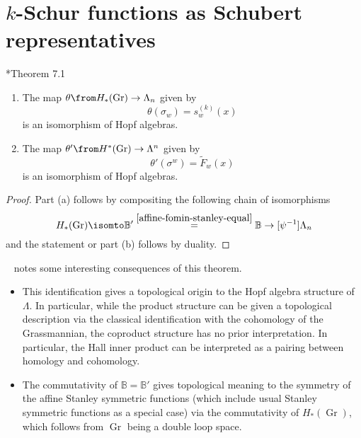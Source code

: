 \documentclass[11pt,leqno,oneside]{amsart}
\numberwithin{thm}{section}
\newcommand{\B}{\mathbb{B}}
\newcommand{\Gr}{\operatorname{Gr}}
\newcommand{\sym}{\Lambda}
\begin{document}
\section{\(k\)-Schur functions as Schubert representatives}\label{schubert-representatives}
\begin{thm}{\cite{lam}*{Theorem 7.1}}\label{k-schur-functions-are-schubert-reps}
  \begin{enumerate}
  \item The map \(\theta \from H_*(\Gr) \to \sym_n\) given by
    \[
      \theta(\sigma_w) = s_w^{(k)}(x)
    \]
    is an isomorphism of Hopf algebras.
  \item The map
    \(\theta' \from H^*(\Gr) \to \sym^n\) given by
    \[
      \theta'(\sigma^w) = \tilde{F}_w(x)
    \]
    is an isomorphism of Hopf algebras.
  \end{enumerate}
\end{thm}
\begin{proof}
  Part (a) follows by compositing the following chain of isomorphisms \[
    H_*(\Gr) \isomto \B' \overset{\ref{affine-fomin-stanley-equal}}{=}
    \B \to[\psi^{-1}] \sym_n 
  \]
  and the statement or part (b) follows by duality.
\end{proof}
~\cite{lam} notes some interesting consequences of this theorem.
\begin{itemize}
\item This identification gives a topological origin to the Hopf
  algebra structure of \(\sym\). In particular, while the product
  structure can be given a topological description via the classical
  identification with the cohomology of the Grassmannian, the
  coproduct structure has no prior interpretation. In particular, the
  Hall inner product can be interpreted as a pairing between homology
  and cohomology.
\item The commutativity of \(\B = \B'\) gives topological meaning to
  the symmetry of the affine Stanley symmetric functions (which
  include usual Stanley symmetric functions as a special case) via the
  commutativity of \(H_*(\Gr)\), which follows from \(\Gr\) being a
  double loop space.
\end{itemize}
\end{document}
